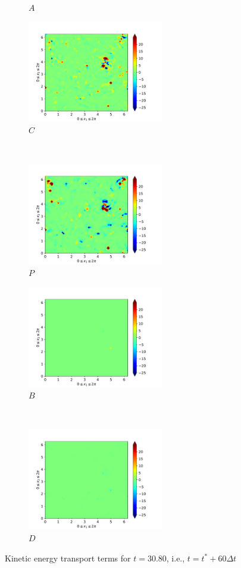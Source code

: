 \begin{figure}[H]
\begin{subfigure}{0.45\textwidth}
        \caption{$A$}
    \end{subfigure}
    \newline
    \begin{subfigure}{0.45\textwidth}
        \includegraphics[height=1.75in]{media/run-cds-65/C-ke-1400}
        \caption{$C$}
    \end{subfigure}
    ~
    \begin{subfigure}{0.45\textwidth}
        \includegraphics[height=1.75in]{media/run-cds-65/P-ke-1400}
        \caption{$P$}
    \end{subfigure}
    \newline
    \begin{subfigure}{0.45\textwidth}
        \includegraphics[height=1.75in]{media/run-cds-65/B-ke-1400}
        \caption{$B$}
    \end{subfigure}
    ~
    \begin{subfigure}{0.45\textwidth}
        \includegraphics[height=1.75in]{media/run-cds-65/D-ke-1400}
        \caption{$D$}
    \end{subfigure}
    \caption{Kinetic energy transport terms for $t=30.80$, i.e., $t=t^{\ast} + 60 \Delta t$}
\end{figure}
